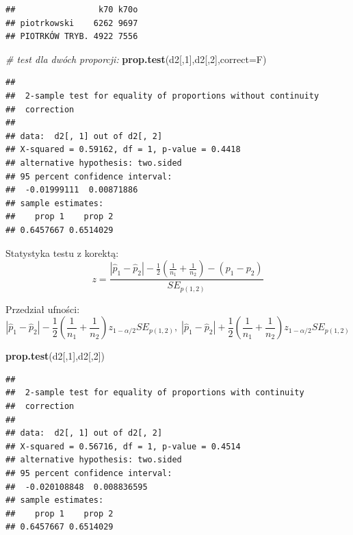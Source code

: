\documentclass[polish,]{book}
\newenvironment{Shaded}{\begin{snugshade}}{\end{snugshade}}
\newcommand{\CommentTok}[1]{\textcolor[rgb]{0.56,0.35,0.01}{\textit{#1}}}
\newcommand{\DataTypeTok}[1]{\textcolor[rgb]{0.13,0.29,0.53}{#1}}
\newcommand{\DecValTok}[1]{\textcolor[rgb]{0.00,0.00,0.81}{#1}}
\newcommand{\KeywordTok}[1]{\textcolor[rgb]{0.13,0.29,0.53}{\textbf{#1}}}
\newcommand{\NormalTok}[1]{#1}
\begin{document}
\begin{verbatim}
##                 k70 k70o
## piotrkowski    6262 9697
## PIOTRKÓW TRYB. 4922 7556
\end{verbatim}

\begin{Shaded}
\begin{Highlighting}[]
\CommentTok{# test dla dwóch proporcji:}
\KeywordTok{prop.test}\NormalTok{(d2[,}\DecValTok{1}\NormalTok{],d2[,}\DecValTok{2}\NormalTok{],}\DataTypeTok{correct=}\NormalTok{F)}
\end{Highlighting}
\end{Shaded}

\begin{verbatim}
## 
##  2-sample test for equality of proportions without continuity
##  correction
## 
## data:  d2[, 1] out of d2[, 2]
## X-squared = 0.59162, df = 1, p-value = 0.4418
## alternative hypothesis: two.sided
## 95 percent confidence interval:
##  -0.01999111  0.00871886
## sample estimates:
##    prop 1    prop 2 
## 0.6457667 0.6514029
\end{verbatim}

Statystyka testu z korektą:
\begin{equation}
z=\frac{|\hat{p}_1-\hat{p}_2|-\frac{1}{2}\left(\frac{1}{n_1}+\frac{1}{n_2}\right)-(p_1-p_2)}{SE_{p(1,2)}}
\label{eq:wz1166}
\end{equation}

Przedział ufności:
\begin{equation}
|\hat{p}_1-\hat{p}_2|-\frac{1}{2}\left(\frac{1}{n_1}+\frac{1}{n_2}\right)z_{1-\alpha/2}SE_{p(1,2)},\;|\hat{p}_1-\hat{p}_2|+\frac{1}{2}\left(\frac{1}{n_1}+\frac{1}{n_2}\right)z_{1-\alpha/2}SE_{p(1,2)}
\label{eq:wz1167}
\end{equation}

\begin{Shaded}
\begin{Highlighting}[]
\KeywordTok{prop.test}\NormalTok{(d2[,}\DecValTok{1}\NormalTok{],d2[,}\DecValTok{2}\NormalTok{])}
\end{Highlighting}
\end{Shaded}

\begin{verbatim}
## 
##  2-sample test for equality of proportions with continuity
##  correction
## 
## data:  d2[, 1] out of d2[, 2]
## X-squared = 0.56716, df = 1, p-value = 0.4514
## alternative hypothesis: two.sided
## 95 percent confidence interval:
##  -0.020108848  0.008836595
## sample estimates:
##    prop 1    prop 2 
## 0.6457667 0.6514029
\end{verbatim}
\end{document}
